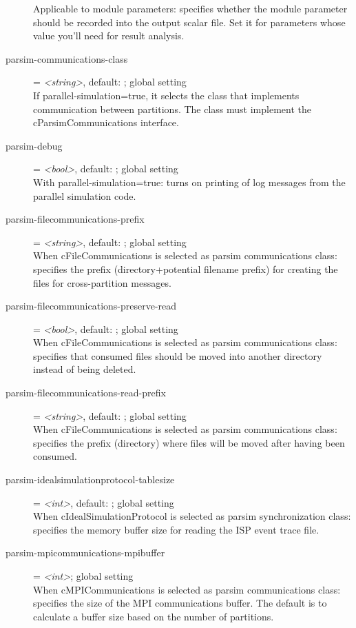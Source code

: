\begin{description}
    Applicable to module parameters: specifies whether the module parameter
    should be recorded into the output scalar file. Set it for parameters whose
    value you'll need for result analysis.
\item[parsim-communications-class] = \textit{<string>}, default: ; global setting \\
    If parallel-simulation=true, it selects the class that implements
    communication between partitions. The class must implement the
    cParsimCommunications interface.
\item[parsim-debug] = \textit{<bool>}, default: ; global setting \\
    With parallel-simulation=true: turns on printing of log messages from the
    parallel simulation code.
\item[parsim-filecommunications-prefix] = \textit{<string>}, default: ; global setting \\
    When cFileCommunications is selected as parsim communications class:
    specifies the prefix (directory+potential filename prefix) for creating the
    files for cross-partition messages.
\item[parsim-filecommunications-preserve-read] = \textit{<bool>}, default: ; global setting \\
    When cFileCommunications is selected as parsim communications class:
    specifies that consumed files should be moved into another directory
    instead of being deleted.
\item[parsim-filecommunications-read-prefix] = \textit{<string>}, default: ; global setting \\
    When cFileCommunications is selected as parsim communications class:
    specifies the prefix (directory) where files will be moved after having
    been consumed.
\item[parsim-idealsimulationprotocol-tablesize] = \textit{<int>}, default: ; global setting \\
    When cIdealSimulationProtocol is selected as parsim synchronization class:
    specifies the memory buffer size for reading the ISP event trace file.
\item[parsim-mpicommunications-mpibuffer] = \textit{<int>}; global setting \\
    When cMPICommunications is selected as parsim communications class:
    specifies the size of the MPI communications buffer. The default is to
    calculate a buffer size based on the number of partitions.

\end{description}
